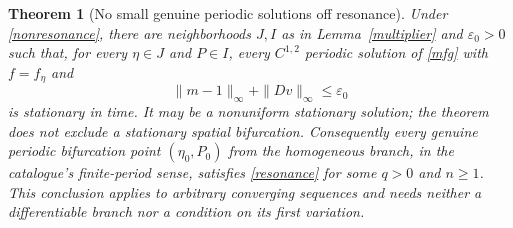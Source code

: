 \documentclass[11pt]{article}
\newtheorem{theorem}{Theorem}
\begin{document}
\begin{theorem}[No small genuine periodic solutions off resonance]
\label{nonlinearresonance}
Under \eqref{nonresonance}, there are neighborhoods $J,I$ as in
Lemma~\ref{multiplier} and $\varepsilon_0>0$ such that, for every
$\eta\in J$ and $P\in I$, every $C^{1,2}$ periodic solution of
\eqref{mfg} with $f=f_\eta$ and
\[
 \|m-1\|_\infty+\|Dv\|_\infty\leq\varepsilon_0
\]
is stationary in time. It may be a nonuniform stationary solution; the
theorem does not exclude a stationary spatial bifurcation.
Consequently every genuine periodic bifurcation point $(\eta_0,P_0)$
from the homogeneous branch, in the catalogue's finite-period sense,
satisfies \eqref{resonance} for some $q>0$ and $n\geq1$.
This conclusion applies to arbitrary converging sequences and needs
neither a differentiable branch nor a condition on its first variation.
\end{theorem}
\end{document}
